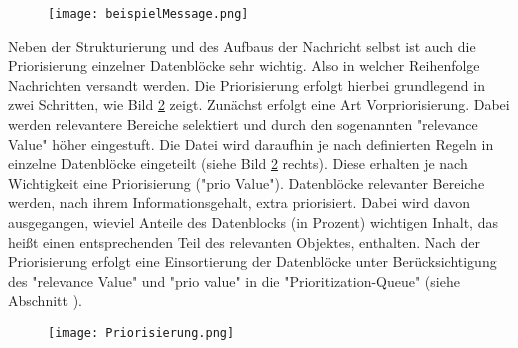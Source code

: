 \begin{figure}[H]
	\centering
	\texttt{[image: beispielMessage.png]}
	\label{fig:beispielJPG}
\end{figure}

Neben der Strukturierung und des Aufbaus der Nachricht selbst ist auch die
Priorisierung einzelner Datenblöcke sehr wichtig. Also in welcher Reihenfolge
Nachrichten versandt werden. Die Priorisierung erfolgt hierbei grundlegend in
zwei Schritten, wie Bild \ref{fig:priorisierungen} zeigt. Zunächst erfolgt eine
Art Vorpriorisierung. Dabei werden relevantere Bereiche selektiert und durch den
sogenannten "relevance Value" höher eingestuft. Die Datei wird daraufhin je nach
definierten Regeln in einzelne Datenblöcke eingeteilt (siehe Bild
\ref{fig:priorisierungen} rechts). Diese erhalten je nach Wichtigkeit eine
Priorisierung ("prio Value"). Datenblöcke relevanter Bereiche werden, nach ihrem
Informationsgehalt, extra priorisiert. Dabei wird davon ausgegangen, wieviel
Anteile des Datenblocks (in Prozent) wichtigen Inhalt, das heißt einen
entsprechenden Teil des relevanten Objektes, enthalten. Nach der Priorisierung
erfolgt eine Einsortierung der Datenblöcke unter Berücksichtigung des "relevance
Value" und "prio value" in die "Prioritization-Queue" (siehe Abschnitt
). 

\begin{figure}[H]
	\centering
	\texttt{[image: Priorisierung.png]}
	\label{fig:priorisierungen}
\end{figure}
